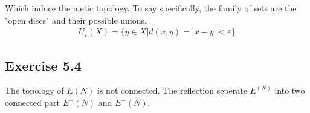 \documentclass[]{ctexart}
\begin{document}
		Which induce the metic topology. To say specifically, the family of sets are the "open discs" and their possible unions. 
			\begin{equation*}
			\begin{aligned}
				U_{\varepsilon}(X)=\{y\in X| d(x,y)=|x-y|<\varepsilon\}
			\end{aligned}
			\end{equation*}
	
	\subsection{Exercise 5.4}
		The topology of $E(N)$ is not connected. The reflection seperate $E^(N)$ into two connected part $E^+(N)$ and $E^-(N)$. 
			\begin{center}
				
				
				
				\begin{tikzpicture}[x=0.75pt,y=0.75pt,yscale=-1,xscale=1]
				

\end{tikzpicture}
\end{center}
\end{document}
